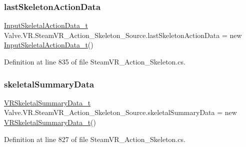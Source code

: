 \subsubsection{\texorpdfstring{lastSkeletonActionData}{lastSkeletonActionData}}
{\footnotesize\ttfamily \mbox{\hyperlink{struct_valve_1_1_v_r_1_1_input_skeletal_action_data__t}{Input\+Skeletal\+Action\+Data\+\_\+t}} Valve.\+V\+R.\+Steam\+V\+R\+\_\+\+Action\+\_\+\+Skeleton\+\_\+\+Source.\+last\+Skeleton\+Action\+Data = new \mbox{\hyperlink{struct_valve_1_1_v_r_1_1_input_skeletal_action_data__t}{Input\+Skeletal\+Action\+Data\+\_\+t}}()\hspace{0.3cm}{\ttfamily [protected]}}



Definition at line 835 of file Steam\+V\+R\+\_\+\+Action\+\_\+\+Skeleton.\+cs.

\mbox{\label{class_valve_1_1_v_r_1_1_steam_v_r___action___skeleton___source_a3b5bb5cca79e02c5864ca1025ebe7531}} 
\subsubsection{\texorpdfstring{skeletalSummaryData}{skeletalSummaryData}}
{\footnotesize\ttfamily \mbox{\hyperlink{struct_valve_1_1_v_r_1_1_v_r_skeletal_summary_data__t}{V\+R\+Skeletal\+Summary\+Data\+\_\+t}} Valve.\+V\+R.\+Steam\+V\+R\+\_\+\+Action\+\_\+\+Skeleton\+\_\+\+Source.\+skeletal\+Summary\+Data = new \mbox{\hyperlink{struct_valve_1_1_v_r_1_1_v_r_skeletal_summary_data__t}{V\+R\+Skeletal\+Summary\+Data\+\_\+t}}()\hspace{0.3cm}{\ttfamily [protected]}}



Definition at line 827 of file Steam\+V\+R\+\_\+\+Action\+\_\+\+Skeleton.\+cs.

\mbox{\label{class_valve_1_1_v_r_1_1_steam_v_r___action___skeleton___source_a6c6d0f535d4caebf144e346f6af38091}} 
